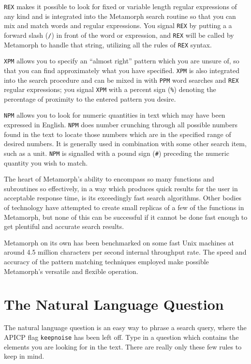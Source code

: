 \verb`REX` makes it possible to look for fixed or variable length
regular expressions of any kind and is integrated into the Metamorph
search routine so that you can mix and match words and regular
expressions.  You signal \verb`REX` by putting a a forward slash
(\verb`/`) in front of the word or expression, and \verb`REX` will be
called by Metamorph to handle that string, utilizing all the rules of
\verb`REX` syntax.

\verb`XPM` allows you to specify an ``almost right'' pattern which you
are unsure of, so that you can find approximately what you have
specified.  \verb`XPM` is also integrated into the search procedure
and can be mixed in with \verb`PPM` word searches and \verb`REX`
regular expressions; you signal \verb`XPM` with a percent sign
(\verb`%`) denoting the percentage of proximity to the entered pattern
you desire.

\verb`NPM` allows you to look for numeric quantities in text which may
have been expressed in English.  \verb`NPM` does number crunching
through all possible numbers found in the text to locate those numbers
which are in the specified range of desired numbers.  It is generally
used in combination with some other search item, such as a unit.
\verb`NPM` is signalled with a pound sign (\verb`#`) preceding the
numeric quantity you wish to match.

The heart of Metamorph's ability to encompass so many functions and
subroutines so effectively, in a way which produces quick results for
the user in acceptable response time, is its exceedingly fast search
algorithms.  Other bodies of technology have attempted to create small
replicas of a few of the functions in Metamorph, but none of this can
be successful if it cannot be done fast enough to get plentiful and
accurate search results.

Metamorph on its own has been benchmarked on some fast Unix machines
at around 4.5 million characters per second internal throughput rate.
The speed and accuracy of the pattern matching techniques employed
make possible Metamorph's versatile and flexible operation.

\section{The Natural Language Question}

The natural language question is an easy way to phrase a search query,
where the APICP flag \verb`keepnoise` has been left off.  Type in a
question which contains the elements you are looking for in the text.
There are really only these few rules to keep in mind.

